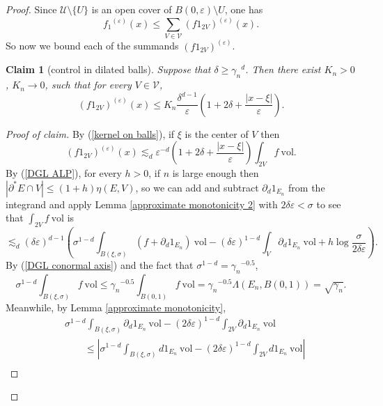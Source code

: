 \documentclass[reqno,12pt,letterpaper]{amsart}
\newcommand{\vol}{\mathrm{vol}}
\newtheorem{claim}[theorem]{Claim}
\theoremstyle{definition}
\numberwithin{equation}{section}
\begin{document}
\begin{proof}
Since $\mathcal U \setminus \{U\}$ is an open cover of $B(0, \varepsilon) \setminus U$, one has
$${f_1}^{(\varepsilon)}(x) \leq \sum_{V \in \mathcal V} (f1_{2V})^{(\varepsilon)}(x).$$
So now we bound each of the summands $(f1_{2V})^{(\varepsilon)}$.

\begin{claim}[control in dilated balls]\label{dilated balls claim}
Suppose that $\delta \geq {\gamma_n}^d$.
Then there exist $K_n > 0$, $K_n \to 0$, such that for every $V \in \mathcal V$,
$$(f1_{2V})^{(\varepsilon)}(x) \leq K_n \frac{\delta^{d - 1}}{\varepsilon}\left(1 + 2\delta + \frac{|x - \xi|}{\varepsilon}\right).$$
\end{claim}
\begin{proof}[Proof of claim]
By (\ref{kernel on balls}), if $\xi$ is the center of $V$ then
\begin{equation}\label{dilated balls 0}
(f1_{2V})^{(\varepsilon)}(x) \lesssim_d \varepsilon^{-d} \left(1 + 2\delta + \frac{|x - \xi|}{\varepsilon}\right) \int_{2V} f ~\vol.
\end{equation}
By (\ref{DGL ALP}), for every $h > 0$, if $n$ is large enough then $|\partial^* E \cap V| \leq (1 + h)\eta(E, V)$, so we can add and subtract $\partial_d 1_{E_n}$ from the integrand and apply Lemma \ref{approximate monotonicity 2} with $2\delta \varepsilon < \sigma$ to see that $\int_{2V} f ~\vol$ is
\begin{equation}\label{dilated balls 1}
\lesssim_d (\delta \varepsilon)^{d - 1} \left(\sigma^{1 - d} \int_{B(\xi, \sigma)} (f + \partial_d 1_{E_n}) ~\vol - (\delta\varepsilon)^{1 - d} \int_V \partial_d 1_{E_n} ~\vol + h\log\frac{\sigma}{2 \delta\varepsilon}\right).
\end{equation}
By (\ref{DGL conormal axis}) and the fact that $\sigma^{1 - d} = {\gamma_n}^{-0.5}$,
\begin{equation}\label{DGL conormal axis consequence}
\sigma^{1 - d}\int_{B(\xi, \sigma)} f ~\vol \leq {\gamma_n}^{-0.5} \int_{B(0, 1)} f ~\vol = {\gamma_n}^{-0.5} \Lambda(E_n, B(0, 1)) = \sqrt{\gamma_n}.
\end{equation}
Meanwhile, by Lemma \ref{approximate monotonicity},
\begin{align*}
&\sigma^{1 - d} \int_{B(\xi, \sigma)} \partial_d1_{E_n} ~\vol - (2\delta\varepsilon)^{1 - d} \int_{2V} \partial_d1_{E_n} ~\vol\\
& \qquad \leq \left|\sigma^{1 - d} \int_{B(\xi, \sigma)} d1_{E_n} ~\vol - (2\delta\varepsilon)^{1 - d} \int_{2V} d1_{E_n} ~\vol\right|\\

\end{align*}
\end{proof}
\end{proof}
\end{document}

